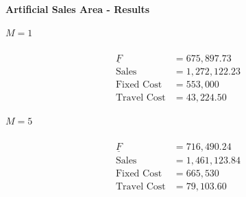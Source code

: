\begin{frame}{\textbf{Artificial Sales Area - Results}}
\begin{minipage}{0.48\linewidth}
\begin{center}
    $M = 1$\\[0.5em]
     \\[-0.5cm]
    \begin{align*}
    \underline{F}&=675,897.73 \\
    \text{Sales} &= 1,272,122.23 \\
    \text{Fixed Cost} &= 553,000 \\
    \text{Travel Cost} &= 43,224.50
    \end{align*}
    
\end{center}
\end{minipage}
\begin{minipage}{0.48\linewidth}
\begin{center}
    $M=5$ \\[0.5em]
     \\[-0.5cm]
    \begin{align*}
    \underline{F}&=716,490.24 \\
    \text{Sales} &= 1,461,123.84 \\
    \text{Fixed Cost} &= 665,530 \\
    \text{Travel Cost} &= 79,103.60
    \end{align*}
\end{center}
\end{minipage}
\end{frame}

%     


